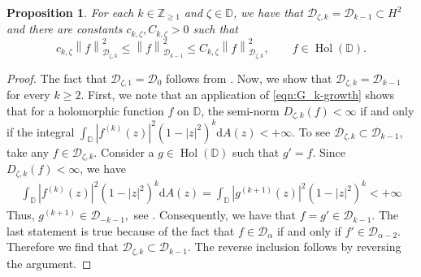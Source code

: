 \documentclass[10pt,oneside,reqno]{amsart}
\newtheorem{proposition}[theorem]{Proposition}
\theoremstyle{definition}
\theoremstyle{remark}
\newcommand{\scrD}{{\mathscr D}}
\newcommand{\norm}[1]{\left\lVert #1 \right\rVert}
\newcommand{\abs}[1]{\left\lvert #1 \right\rvert}
\renewcommand{\le}{\leqslant}
\renewcommand{\ge}{\geqslant}
\newcommand{\D}{\mathbb D}
\numberwithin{equation}{section}
\begin{document}
\begin{proposition} \label{prop:equivalence-of-norm}
    For each $k \in \mathbb Z_{\geqslant 1}$ and $\zeta \in \mathbb D$, we have that $\mathscr D_{ \zeta, k} = \mathscr{D}_{k-1} \subset H^{2}$ and there are constants $c_{k, \zeta}, C_{k, \zeta} > 0$ such that 
    \begin{equation}
	c_{k, \zeta}  \norm{f}_{\mathscr D{_{\zeta, k}}} ^{2}  \le \norm{f}_{\mathscr{D}_{k-1}}^{2} \le C_{k, \zeta}  \norm{f}_{\mathscr D{_{ \zeta, k}}} ^{2},  \qquad f\in \operatorname{Hol} \left( \D \right).
    \label{eqn:equivalent-norms-on-Dk}
    \end{equation}
\end{proposition}
\begin{proof}
The fact that $\mathscr D_{\zeta, 1} = \scrD_{0}$ follows from \cite[Proposition 2.6]{1993multiplication}. Now, we show that $\mathscr D_{ \zeta, k} = \scrD_{k-1}$ for every $k\ge 2.$ First, we note that an application of \eqref{eqn:G_k-growth} shows that for a holomorphic function $f$ on $\D$, the semi-norm $D_{\zeta, k} (f) < \infty$ if and only if the integral $\int_{\D} \abs{f^{(k)} (z)}^2 (1-\abs{z}^2)^{k} \mathrm{d}A(z) < +\infty.$ To see $\mathscr D_{\zeta, k} \subset \scrD_{k-1}$, take any $f \in \mathscr D_{\zeta, k}$. Consider a $g \in \operatorname{Hol} (\D)$ such that $g'=f$. Since $D_{\zeta,k } (f) < \infty$, we have 
\begin{align*}
    \int_{\D} \abs{f^{(k)} (z)}^2 (1-\abs{z}^2)^{k} \mathrm{d}A(z) = \int_{\D} \abs{g^{(k+1)} (z)}^2 (1-\abs{z}^2)^{k} < +\infty
\end{align*}
 Thus, $g^{(k+1)}\in \scrD_{-k-1},$ see \cite[p. 229]{Taylor66}. Consequently, we have that $f =g' \in \scrD_{k-1}$. The last statement is true because of the fact that $f \in \scrD_{\alpha}$ if and only if $f' \in \scrD_{\alpha-2}$. Therefore we find that $\mathscr D_{\zeta,k}\subset \mathscr D_{k-1}.$ The reverse inclusion follows by reversing the argument.


\end{proof}
\end{document}
